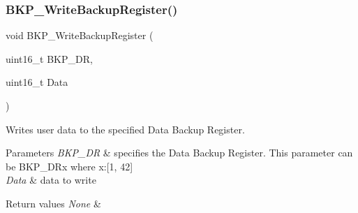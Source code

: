 \subsubsection{\texorpdfstring{BKP\_WriteBackupRegister()}{BKP\_WriteBackupRegister()}}
{\footnotesize\ttfamily void B\+K\+P\+\_\+\+Write\+Backup\+Register (\begin{DoxyParamCaption}\item[{uint16\+\_\+t}]{B\+K\+P\+\_\+\+DR,  }\item[{uint16\+\_\+t}]{Data }\end{DoxyParamCaption})}



Writes user data to the specified Data Backup Register. 


\begin{DoxyParams}{Parameters}
{\em B\+K\+P\+\_\+\+DR} & specifies the Data Backup Register. This parameter can be B\+K\+P\+\_\+\+D\+Rx where x\+:\mbox{[}1, 42\mbox{]} \\
\hline
{\em Data} & data to write \\
\hline
\end{DoxyParams}

\begin{DoxyRetVals}{Return values}
{\em None} & \\
\hline
\end{DoxyRetVals}
